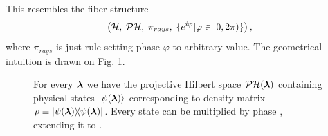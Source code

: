 This resembles the fiber structure
$$\left(\mathcal{H},\;\mathcal{P}\mathcal{H},\;\pi_{rays},\;\{e^{i\varphi}| \varphi\in[0,2\pi)\}\right),$$
where $\pi_{rays}$ is just rule setting phase $\varphi$ to arbitrary value. The geometrical intuition is drawn on Fig. \ref{fig:projectiveHilbertSpace}.



\begin{figure}[h]
    \centering
\caption{For every ${\bm\lambda}$ we have the projective Hilbert space $\mathcal{P}\mathcal{H}({\bm\lambda})$ containing physical states $\ket{\psi({\bm\lambda})}$ corresponding to density matrix $\rho\equiv\ket{\psi({\bm\lambda})}\!\!\bra{\psi({\bm\lambda})}$. Every state can be multiplied by phase , extending it to .}
    \label{fig:projectiveHilbertSpace}
\end{figure}







